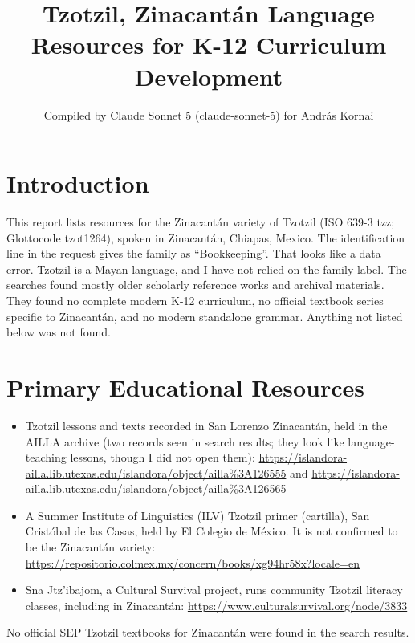 \documentclass[12pt]{article}
\title{Tzotzil, Zinacant\'an Language Resources for K-12 Curriculum Development}
\author{Compiled by Claude Sonnet 5 (claude-sonnet-5) for Andr\'as Kornai}
\date{}
\begin{document}
\maketitle

\section{Introduction}
This report lists resources for the Zinacant\'an variety of Tzotzil (ISO 639-3 tzz; Glottocode tzot1264), spoken in Zinacant\'an, Chiapas, Mexico. The identification line in the request gives the family as ``Bookkeeping''. That looks like a data error. Tzotzil is a Mayan language, and I have not relied on the family label. The searches found mostly older scholarly reference works and archival materials. They found no complete modern K-12 curriculum, no official textbook series specific to Zinacant\'an, and no modern standalone grammar. Anything not listed below was not found.

\section{Primary Educational Resources}
\begin{itemize}
\item Tzotzil lessons and texts recorded in San Lorenzo Zinacant\'an, held in the AILLA archive (two records seen in search results; they look like language-teaching lessons, though I did not open them): \url{https://islandora-ailla.lib.utexas.edu/islandora/object/ailla%3A126555} and \url{https://islandora-ailla.lib.utexas.edu/islandora/object/ailla%3A126565}
\item A Summer Institute of Linguistics (ILV) Tzotzil primer (cartilla), San Crist\'obal de las Casas, held by El Colegio de M\'exico. It is not confirmed to be the Zinacant\'an variety: \url{https://repositorio.colmex.mx/concern/books/xg94hr58x?locale=en}
\item Sna Jtz'ibajom, a Cultural Survival project, runs community Tzotzil literacy classes, including in Zinacant\'an: \url{https://www.culturalsurvival.org/node/3833}
\end{itemize}
No official SEP Tzotzil textbooks for Zinacant\'an were found in the search results.
\end{document}

